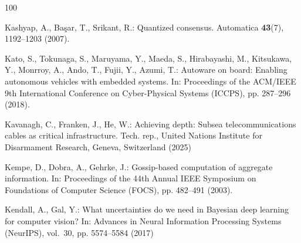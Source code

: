 \documentclass[graybox,envcountchap]{style/SNmono}
\begin{document}
\begin{thebibliography}{100}

Kashyap, A., Ba{\c{s}}ar, T., Srikant, R.: Quantized consensus.
\newblock Automatica \textbf{43}(7), 1192--1203 (2007).
\newblock {}



Kato, S., Tokunaga, S., Maruyama, Y., Maeda, S., Hirabayashi, M., Kitsukawa,
  Y., Monrroy, A., Ando, T., Fujii, Y., Azumi, T.: Autoware on board: Enabling
  autonomous vehicles with embedded systems.
\newblock In: Proceedings of the ACM/IEEE 9th International Conference on
  Cyber-Physical Systems (ICCPS), pp. 287--296 (2018).
\newblock {}


{\color{red} 
Kavanagh, C., Franken, J., He, W.: Achieving depth: Subsea telecommunications
  cables as critical infrastructure.
\newblock Tech. rep., United Nations Institute for Disarmament Research,
  Geneva, Switzerland (2025)

\par}

Kempe, D., Dobra, A., Gehrke, J.: Gossip-based computation of aggregate
  information.
\newblock In: Proceedings of the 44th Annual IEEE Symposium on Foundations of
  Computer Science (FOCS), pp. 482--491 (2003).
\newblock {}


{\color{red} 
Kendall, A., Gal, Y.: What uncertainties do we need in {B}ayesian deep learning
  for computer vision?
\newblock In: Advances in Neural Information Processing Systems (NeurIPS),
  vol.~30, pp. 5574--5584 (2017)

\par}
\end{thebibliography}
\end{document}
